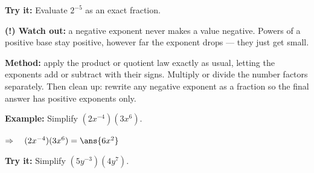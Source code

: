 \documentclass[12pt]{article}
\begin{document}
\begin{tryitbox}
\textbf{Try it:} \quad Evaluate $2^{-5}$ as an exact fraction.\\[2pt]
\end{tryitbox}

\begin{watchoutbox}
\textbf{(!) Watch out:} a negative exponent never makes a value negative. Powers of a
positive base stay positive, however far the exponent drops --- they just get small.
\end{watchoutbox}


\begin{formulabox}
\textbf{Method:} apply the product or quotient law exactly as usual, letting the exponents
add or subtract with their signs. Multiply or divide the number factors separately. Then
clean up: rewrite any negative exponent as a fraction so the final answer has positive
exponents only.
\end{formulabox}

\begin{examplebox}
\textbf{Example:} \quad Simplify $(2x^{-4})(3x^6)$.

$\Rightarrow\quad (2x^{-4})(3x^6) = \ans{6x^2}$
\end{examplebox}

\begin{tryitbox}
\textbf{Try it:} \quad Simplify $(5y^{-3})(4y^7)$.\\[2pt]
\end{tryitbox}
\end{document}
